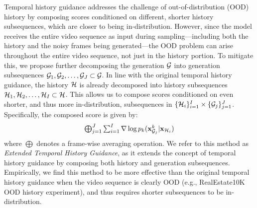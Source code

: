 Temporal history guidance addresses the challenge of out-of-distribution (OOD) history by composing scores conditioned on different, shorter history subsequences, which are closer to being in-distribution. However, since the model receives the entire video sequence as input during sampling—including both the history and the noisy frames being generated—the OOD problem can arise throughout the entire video sequence, not just in the history portion. To mitigate this, we propose further decomposing the generation ${\mathcal{G}}$ into generation subsequences ${\mathcal{G}}_1, {\mathcal{G}}_2, \ldots, {\mathcal{G}}_{J} \subset {\mathcal{G}}$. In line with the original temporal history guidance, the history ${\mathcal{H}}$ is already decomposed into history subsequences ${\mathcal{H}}_1, {\mathcal{H}}_2, \ldots, {\mathcal{H}}_{I} \subset {\mathcal{H}}$. This allows us to compose scores conditioned on even shorter, and thus more in-distribution, subsequences in $\{{\mathcal{H}}_i\}_{i=1}^{I} \times \{{\mathcal{G}}_j\}_{j=1}^{J}$. Specifically, the composed score is given by:
\begin{equation}
    \scalebox{1.0}{$
    \bigoplus_{j=1}^{J} \sum_{i=1}^{I} \score p_k(\rvx_{\cG_j}^k | \rvx_{\cH_i})$}
\end{equation}
where $\bigoplus$ denotes a frame-wise averaging operation. We refer to this method as \emph{Extended Temporal History Guidance}, as it extends the concept of temporal history guidance by composing both history and generation subsequences. Empirically, we find this method to be more effective than the original temporal history guidance when the video sequence is clearly OOD (e.g., RealEstate10K OOD history experiment), and thus requires shorter subsequences to be in-distribution.
